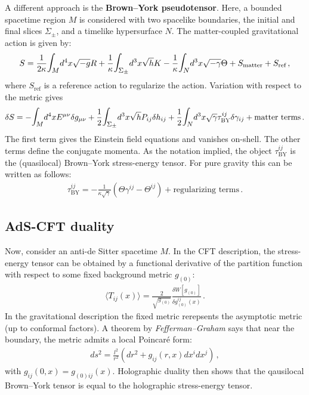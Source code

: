     A different approach is the \textbf{Brown--York pseudotensor}. Here, a bounded spacetime region $M$ is considered with two spacelike boundaries, the initial and final slices $\Sigma_\pm$, and a timelike hypersurface $N$. The matter-coupled gravitational action is given by:
    \begin{gather}
        S = \frac{1}{2\kappa}\Int_Md^4x\sqrt{-g}R + \frac{1}{\kappa}\Int_{\Sigma_\pm}d^3x\sqrt{h}K - \frac{1}{\kappa}\Int_Nd^3x\sqrt{-\gamma}\Theta + S_{\text{matter}} + S_{\text{ref}}\,,
    \end{gather}
    where $S_{\text{ref}}$ is a reference action to regularize the action. Variation with respect to the metric gives
    \begin{gather}
        \delta S = -\Int_Md^4xE^{\mu\nu}\delta g_{\mu\nu} + \frac{1}{2}\Int_{\Sigma_\pm}d^3x\sqrt{h}P_{ij}\delta h_{ij} + \frac{1}{2}\Int_Nd^3x\sqrt{\gamma}\tau^{ij}_{\text{BY}}\delta\gamma_{ij} +\text{matter terms}\,.
    \end{gather}
    The first term gives the Einstein field equations and vanishes on-shell. The other terms define the conjugate momenta. As the notation implied, the object $\tau^{ij}_{\text{BY}}$ is the (quasilocal) Brown--York stress-energy tensor. For pure gravity this can be written as follows:
    \begin{gather}
        \tau^{ij}_{\text{BY}} = -\frac{1}{\kappa\sqrt{\gamma}}(\Theta\gamma^{ij}-\Theta^{ij}) +\text{regularizing terms}\,.
    \end{gather}

\subsection{AdS-CFT duality}

    Now, consider an anti-de Sitter spacetime $M$. In the CFT description, the stress-energy tensor can be obtained by a functional derivative of the partition function with respect to some fixed background metric $g_{(0)}$:
    \begin{gather}
        \langle T_{ij}(x) \rangle = \frac{2}{\sqrt{g_{(0)}}}\frac{\delta W[g_{(0)}]}{\delta g^{ij}_{(0)}(x)}\,.
    \end{gather}
    In the gravitational description the fixed metric rerepsents the asymptotic metric (up to conformal factors). A theorem by \textit{Fefferman--Graham} says that near the boundary, the metric admits a local Poincar\'e form:
    \begin{gather}
        ds^2 = \frac{l^2}{r^2}(dr^2 + g_{ij}(r,x)dx^idx^j)\,,
    \end{gather}
    with $g_{ij}(0,x) = g_{(0)ij}(x)$. Holographic duality then shows that the qausilocal Brown--York tensor is equal to the holographic stress-energy tensor.

